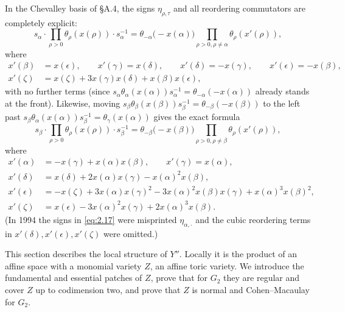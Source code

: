 \documentclass[12pt,letterpaper]{amsart}
\theoremstyle{plain}
\theoremstyle{definition}
\theoremstyle{remark}
\theoremstyle{definition}
\newcommand{\eps}{\epsilon}
\begin{document}
In the Chevalley basis of \S A.4, the signs $\eta_{\rho,\tau}$ and all
reordering commutators are completely explicit:
\begin{equation}\tag{2.16}\label{eq:2.16}
s_\alpha\cdot \prod_{\rho>0}\theta_{\rho}(x(\rho))\cdot s_\alpha^{-1}
=\theta_{-\alpha}\big(-x(\alpha)\big)
\prod_{\rho>0, \rho\not=\alpha}\theta_{\rho}(x'(\rho)),
\end{equation}
where
\[
\begin{split}
x'(\beta)&=x(\epsilon),\qquad
x'(\gamma)=x(\delta),\qquad
x'(\delta)=-x(\gamma),\qquad
x'(\epsilon)=-x(\beta),\\
x'(\zeta)&=x(\zeta)+3x(\gamma)x(\delta)+x(\beta)x(\epsilon),
\end{split}
\]
with no further terms (since $s_\alpha\theta_\alpha(x(\alpha))s_\alpha^{-1}
=\theta_{-\alpha}(-x(\alpha))$ already stands at the front). Likewise, moving
$s_\beta\theta_\beta(x(\beta))s_\beta^{-1}=\theta_{-\beta}(-x(\beta))$ to the
left past $s_\beta\theta_\alpha(x(\alpha))s_\beta^{-1}=\theta_\gamma(x(\alpha))$
gives the exact formula
\begin{equation}\tag{2.17}\label{eq:2.17}
s_\beta\cdot \prod_{\rho>0}\theta_{\rho}(x(\rho))\cdot s_\beta^{-1}
=\theta_{-\beta}\big(-x(\beta)\big)
\prod_{\rho>0, \rho\not=\beta}\theta_{\rho}(x'(\rho)),
\end{equation}
where
\[
\begin{split}
x'(\alpha)&=-x(\gamma)+x(\alpha)x(\beta),\qquad
x'(\gamma)=x(\alpha),\\
x'(\delta)&=x(\delta)+2x(\alpha)x(\gamma)-x(\alpha)^2x(\beta),\\
x'(\epsilon)&=-x(\zeta)+3x(\alpha)x(\gamma)^2-3x(\alpha)^2x(\beta)x(\gamma)+x(\alpha)^3x(\beta)^2,\\
x'(\zeta)&=x(\epsilon)-3x(\alpha)^2x(\gamma)+2x(\alpha)^3x(\beta).
\end{split}
\]
(In 1994 the signs in \eqref{eq:2.17} were misprinted $\eta_{\alpha,\cdot}$ and
the cubic reordering terms in $x'(\delta),x'(\eps),x'(\zeta)$ were omitted.)
\label{sec:3}

This section describes the local structure of $Y''$. Locally it is the
product of an affine space with a monomial variety $Z$, an affine toric
variety. We introduce the fundamental and essential patches of $Z$, prove
that for $G_2$ they are regular and cover $Z$ up to codimension two, and
prove that $Z$ is normal and Cohen--Macaulay for $G_2$.
\end{document}
